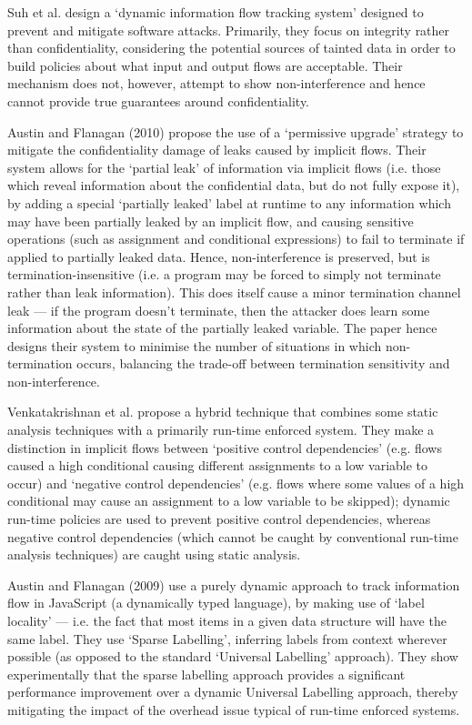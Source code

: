 	Suh et al. \cite{suh2004dynamicintegrity} design a `dynamic information flow tracking system' designed to prevent and mitigate software attacks. Primarily, they focus on integrity rather than confidentiality, considering the potential sources of tainted data in order to build policies about what input and output flows are acceptable. Their mechanism does not, however, attempt to show non-interference and hence cannot provide true guarantees around confidentiality.
	
	Austin and Flanagan (2010) \cite{austin2010runtime} propose the use of a `permissive upgrade' strategy to mitigate the confidentiality damage of leaks caused by implicit flows. Their system allows for the `partial leak' of information via implicit flows (i.e. those which reveal information about the confidential data, but do not fully expose it), by adding a special `partially leaked' label at runtime to any information which may have been partially leaked by an implicit flow, and causing sensitive operations (such as assignment and conditional expressions) to fail to terminate if applied to partially leaked data. Hence, non-interference is preserved, but is termination-insensitive (i.e. a program may be forced to simply not terminate rather than leak information). This does itself cause a minor termination channel leak --- if the program doesn't terminate, then the attacker does learn some information about the state of the partially leaked variable. The paper hence designs their system to minimise the number of situations in which non-termination occurs, balancing the trade-off between termination sensitivity and non-interference.
	
	Venkatakrishnan et al. \cite{venkatakrishnan2006runtime} propose a hybrid technique that combines some static analysis techniques with a primarily run-time enforced system. They make a distinction in implicit flows between `positive control dependencies' (e.g. flows caused a high conditional causing different assignments to a low variable to occur) and `negative control dependencies' (e.g. flows where some values of a high conditional may cause an assignment to a low variable to be skipped); dynamic run-time policies are used to prevent positive control dependencies, whereas negative control dependencies (which cannot be caught by conventional run-time analysis techniques) are caught using static analysis.
	
	Austin and Flanagan (2009) \cite{austin2009dynamicif} use a purely dynamic approach to track information flow in JavaScript (a dynamically typed language), by making use of `label locality' --- i.e. the fact that most items in a given data structure will have the same label. They use `Sparse Labelling', inferring labels from context wherever possible (as opposed to the standard `Universal Labelling' approach). They show experimentally that the sparse labelling approach provides a significant performance improvement over a dynamic Universal Labelling approach, thereby mitigating the impact of the overhead issue typical of run-time enforced systems.
	
